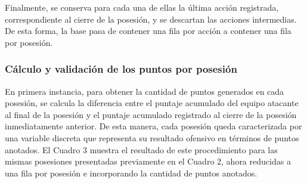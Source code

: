 \documentclass[
  12pt,
]{article}
\begin{document}
\begin{table}[H]
\centering
\caption{\label{tab:unnamed-chunk-12}Ejemplo de secuencia de acciones diferenciando cada posesión}
\centering
{}
\end{table}

Finalmente, se conserva para cada una de ellas la última acción
registrada, correspondiente al cierre de la posesión, y se descartan las
acciones intermedias. De esta forma, la base pasa de contener una fila
por acción a contener una fila por posesión.

\subsubsection{Cálculo y validación de los puntos por
posesión}\label{cuxe1lculo-y-validaciuxf3n-de-los-puntos-por-posesiuxf3n}

En primera instancia, para obtener la cantidad de puntos generados en
cada posesión, se calcula la diferencia entre el puntaje acumulado del
equipo atacante al final de la posesión y el puntaje acumulado
registrado al cierre de la posesión inmediatamente anterior. De esta
manera, cada posesión queda caracterizada por una variable discreta que
representa su resultado ofensivo en términos de puntos anotados. El
Cuadro 3 muestra el resultado de este procedimiento para las mismas
posesiones presentadas previamente en el Cuadro 2, ahora reducidas a una
fila por posesión e incorporando la cantidad de puntos anotados.
\end{document}
